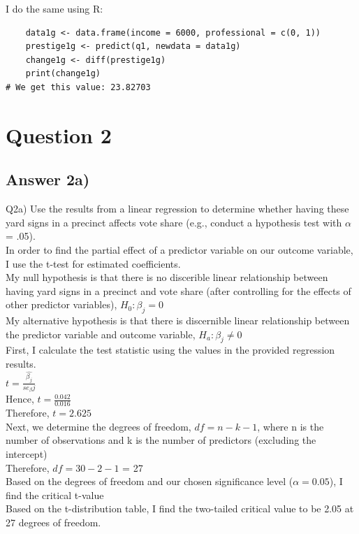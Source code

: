 \documentclass{article}
\begin{document}
I do the same using R:
\begin{verbatim}
    data1g <- data.frame(income = 6000, professional = c(0, 1))
    prestige1g <- predict(q1, newdata = data1g)
    change1g <- diff(prestige1g)
    print(change1g)
# We get this value: 23.82703 
\end{verbatim}

\pagebreak

\section{Question 2}

\subsection{Answer 2a)}
Q2a) Use the results from a linear regression to determine whether having these yard signs in a precinct affects vote share (e.g., conduct a hypothesis test with $\alpha$ = .05).
\\
\noindent In order to find the partial effect of a predictor variable on our outcome variable, I use the t-test for estimated coefficients.
\\
\noindent My null hypothesis is that there is no discerible linear relationship between having yard signs in a precinct and vote share (after controlling for the effects of other predictor variables), $H_0: \beta_j = 0$ 
\\
\noindent My alternative hypothesis is that there is discernible linear relationship between the predictor variable and outcome variable, $H_a: 
\beta_j \neq 0 $
\\
First, I calculate the test statistic using the values in the provided regression results.
\\
$t = \frac{\hat{\beta_j}}{se_\beta j}$
\\
Hence, $t = \frac{0.042}{0.016}$
\\
Therefore, $t = 2.625$
\\
Next, we determine the degrees of freedom,
$df = n - k - 1$,
where n is the number of observations
and k is the number of predictors (excluding the intercept)
\\
Therefore, $df = 30 - 2 - 1$ = 27
\\
Based on the degrees of freedom and our chosen significance level ($\alpha=0.05$), I find the critical t-value
\\
Based on the t-distribution table, I find the two-tailed critical value to 
be 2.05 at 27 degrees of freedom. 
\end{document}
